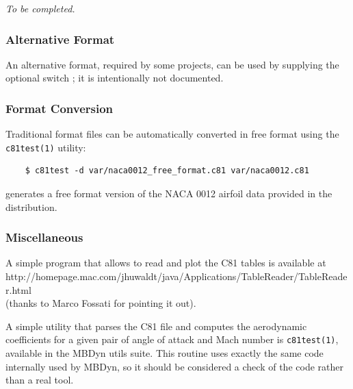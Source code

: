 \emph{To be completed.}

\subsubsection{Alternative Format}
An alternative format, required by some projects, can be used by supplying
the optional switch ; it is intentionally not documented.

\subsubsection{Format Conversion}

Traditional format files can be automatically converted in free format
using the \texttt{c81test(1)} utility:
\begin{verbatim}
    $ c81test -d var/naca0012_free_format.c81 var/naca0012.c81
\end{verbatim}
generates a free format version of the NACA 0012 airfoil data
provided in the distribution.

\subsubsection{Miscellaneous}
A simple program that allows to read and plot the C81 tables
is available at \\
        {http://homepage.mac.com/jhuwaldt/java/Applications/TableReader/TableReader.html} \\
(thanks to Marco Fossati for pointing it out).

A simple utility that parses the C81 file and computes 
the aerodynamic coefficients for a given pair of angle of attack 
and Mach number is \texttt{c81test(1)}, available in the MBDyn utils suite.
This routine uses exactly the same code internally used by MBDyn,
so it should be considered a check of the code rather than a real tool.



